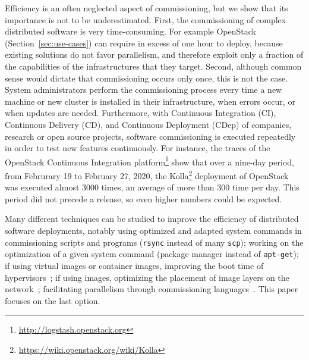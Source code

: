 Efficiency is an often neglected aspect of commissioning, but we show
that its importance is not to be underestimated. First, the
commissioning of complex distributed software is very
time-consuming. For example OpenStack (Section~\ref{sec:use-cases})
can require in excess of one hour to deploy, because existing
solutions do not favor parallelism, and therefore exploit only a
fraction of the capabilities of the infrastructures that they
target. Second, although common sense would dictate that commissioning
occurs only once, this is not the case. System administrators perform
the commissioning process every time a new machine or new cluster is
installed in their infrastructure, when errors occur, or when updates
are needed.
%
Furthermore, with Continuous Integration (CI), Continuous Delivery
(CD), and Continuous Deployment (CDep) of companies, research or open
source projects, software commissioning is executed repeatedly in
order to test new features continuously. For instance, the traces of
the OpenStack Continuous Integration
platform\footnote{\url{http://logstash.openstack.org}} show that over
a nine-day period, from Februrary 19 to February 27, 2020, the
Kolla\footnote{\url{https://wiki.openstack.org/wiki/Kolla}} deployment
of OpenStack was executed almost 3000 times, an average of more than
300 time per day. This period did not precede a release, so even
higher numbers could be expected.


Many different techniques can be studied to improve the
efficiency of distributed software deployments, notably using
optimized and adapted system commands in commissioning scripts and
programs (\eg \texttt{rsync} instead of many \texttt{scp}); working on
the optimization of a given system command (\eg \nix package manager
instead of \texttt{apt-get}); if using virtual images or container
images, improving the boot time of
hypervisors~\cite{nguyen:hal-02172288}; if using \docker images,
optimizing the placement of image layers on the
network~\cite{darrous:hal-01745405}; facilitating parallelism through
commissioning languages~\cite{dicosmo:hal-01233489}. This paper
focuses on the last option.

